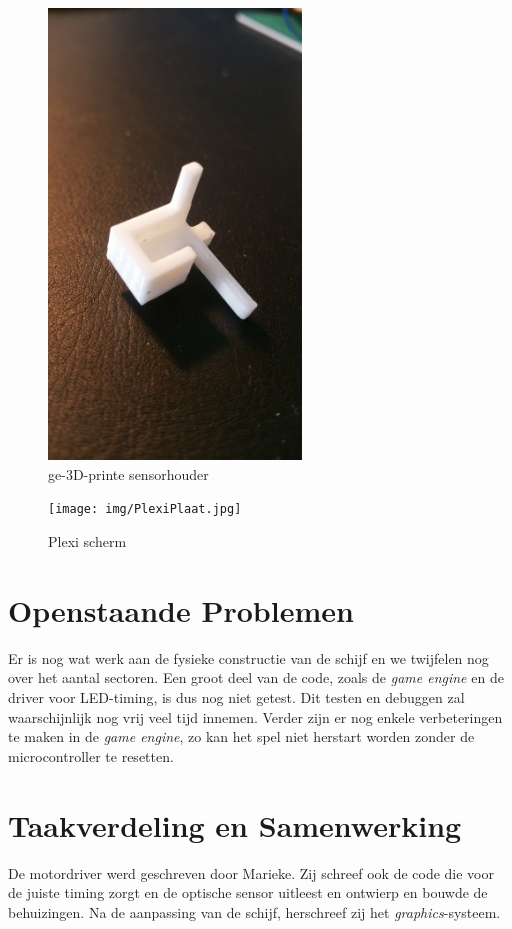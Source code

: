 \documentclass[12pt]{ugentreport}
\begin{document}
\begin{figure}
  \centering
  \includegraphics[width=0.6\textwidth]{img/SensorHouder.jpg}
  \caption{ge-3D-printe sensorhouder}
  \label{fig:sensorhouder}
\end{figure}

\begin{figure}
  \centering
  \texttt{[image: img/PlexiPlaat.jpg]}
  \caption{Plexi scherm}
  \label{fig:plexiplaat}
\end{figure}

\section{Openstaande Problemen}
Er is nog wat werk aan de fysieke constructie van de schijf en we twijfelen nog
over het aantal sectoren. Een groot deel van de code, zoals de \emph{game
  engine} en de driver voor LED-timing, is dus nog niet getest.
Dit testen en debuggen zal waarschijnlijk nog vrij veel tijd innemen.
Verder zijn er nog enkele verbeteringen te maken in de \emph{game engine},
zo kan het spel niet herstart worden zonder de microcontroller te resetten.


\section{Taakverdeling en Samenwerking}
De motordriver werd geschreven door Marieke. Zij schreef ook de code die voor de
juiste timing zorgt en de optische sensor uitleest en ontwierp en bouwde de
behuizingen. Na de aanpassing van de schijf, herschreef zij het \emph{graphics}-systeem.
\end{document}
